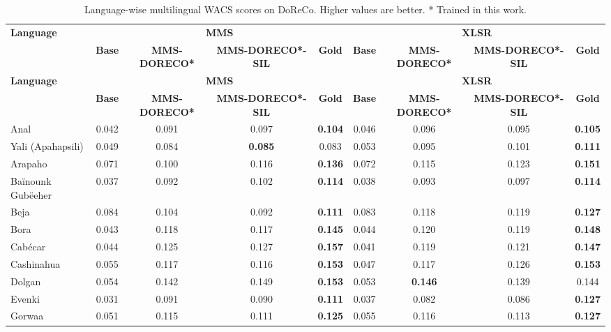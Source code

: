 \begingroup
\scriptsize
\setlength{\tabcolsep}{3pt}
\renewcommand{\arraystretch}{0.92}
\begin{longtable}{lcccccccc}
\caption{Language-wise multilingual WACS scores on DoReCo. Higher values are better. * Trained in this work.}\label{tab:wacs_table_doreco}\\
\toprule
\multirow{2}{*}{\textbf{Language}} & \multicolumn{4}{c}{\textbf{MMS}} & \multicolumn{4}{c}{\textbf{XLSR}} \\
\cmidrule(lr){2-5}\cmidrule(lr){6-9}
& \textbf{Base}& \textbf{MMS-DORECO*}& \textbf{MMS-DORECO*-SIL}& \textbf{Gold}& \textbf{Base}& \textbf{MMS-DORECO*}& \textbf{MMS-DORECO*-SIL}& \textbf{Gold}\\
\midrule
\endfirsthead
\toprule
\multirow{2}{*}{\textbf{Language}} & \multicolumn{4}{c}{\textbf{MMS}} & \multicolumn{4}{c}{\textbf{XLSR}} \\
\cmidrule(lr){2-5}\cmidrule(lr){6-9}
& \textbf{Base}& \textbf{MMS-DORECO*}& \textbf{MMS-DORECO*-SIL}& \textbf{Gold}& \textbf{Base}& \textbf{MMS-DORECO*}& \textbf{MMS-DORECO*-SIL}& \textbf{Gold}\\
\midrule
\endhead
\bottomrule
\endfoot
Anal & 0.042 & 0.091 & 0.097 & \textbf{0.104} & 0.046 & 0.096 & 0.095 & \textbf{0.105} \\
Yali (Apahapsili) & 0.049 & 0.084 & \textbf{0.085} & 0.083 & 0.053 & 0.095 & 0.101 & \textbf{0.111} \\
Arapaho & 0.071 & 0.100 & 0.116 & \textbf{0.136} & 0.072 & 0.115 & 0.123 & \textbf{0.151} \\
Baïnounk Gubëeher & 0.037 & 0.092 & 0.102 & \textbf{0.114} & 0.038 & 0.093 & 0.097 & \textbf{0.114} \\
Beja & 0.084 & 0.104 & 0.092 & \textbf{0.111} & 0.083 & 0.118 & 0.119 & \textbf{0.127} \\
Bora & 0.043 & 0.118 & 0.117 & \textbf{0.145} & 0.044 & 0.120 & 0.119 & \textbf{0.148} \\
Cabécar & 0.044 & 0.125 & 0.127 & \textbf{0.157} & 0.041 & 0.119 & 0.121 & \textbf{0.147} \\
Cashinahua & 0.055 & 0.117 & 0.116 & \textbf{0.153} & 0.047 & 0.117 & 0.126 & \textbf{0.153} \\
Dolgan & 0.054 & 0.142 & 0.149 & \textbf{0.153} & 0.053 & \textbf{0.146} & 0.139 & 0.144 \\
Evenki & 0.031 & 0.091 & 0.090 & \textbf{0.111} & 0.037 & 0.082 & 0.086 & \textbf{0.127} \\
Gorwaa & 0.051 & 0.115 & 0.111 & \textbf{0.125} & 0.055 & 0.116 & 0.113 & \textbf{0.127} \\

\end{longtable}
